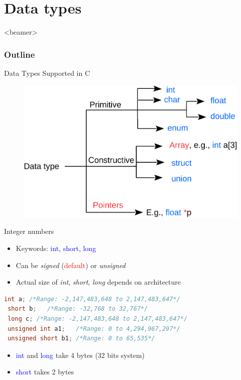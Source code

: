 \section{Data types}
\label{sec:dtype}
\begin{frame}<beamer>
    \frametitle{Outline}
    \tableofcontents[currentsection]
\end{frame}


\begin{frame}{Data Types Supported in C}
\begin{figure}
	\includegraphics[width=0.75\linewidth]{figs/dtypes.pdf}
\end{figure}
\end{frame}

\begin{frame}[fragile]{Integer numbers}
	\begin{itemize}
		\item Keywords: \textcolor{blue}{int}, \textcolor{blue}{short}, \textcolor{blue}{long}
		\item Can be \textit{signed} (\textcolor{red}{default}) or \textit{unsigned}
		\item Actual size of \textit{int}, \textit{short}, \textit{long} depends on architecture
	\end{itemize}
	\begin{center}
	\begin{lstlisting}[language=c,frame=none, linewidth=0.85\linewidth]
 int a;	/*Range: -2,147,483,648 to 2,147,483,647*/
 short b;	/*Range: -32,768 to 32,767*/
 long c; /*Range: -2,147,483,648 to 2,147,483,647*/
 unsigned int a1;	/*Range: 0 to 4,294,967,297*/		
 unsigned short b1;	/*Range: 0 to 65,535*/
	\end{lstlisting}
	\end{center}	
	\begin{itemize}
		\item {\textcolor{blue}{int} and \textcolor{blue}{long} take 4 bytes (32 bits system)}
		\item {\textcolor{blue}{short} takes 2 bytes}
	\end{itemize}
\end{frame}

